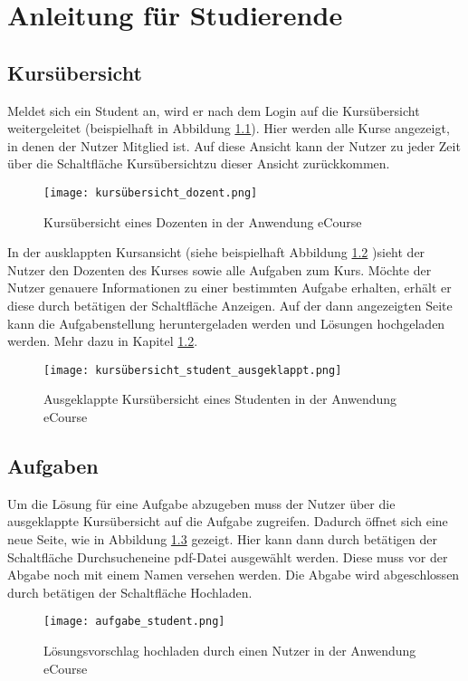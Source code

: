 \chapter{Anleitung für Studierende}
\label{sec:chap3}

\section{Kursübersicht}

Meldet sich ein Student an, wird er nach dem Login auf die Kursübersicht weitergeleitet (beispielhaft in Abbildung \ref{fib:kursübersicht_student}). Hier werden alle Kurse angezeigt, in denen der Nutzer Mitglied ist.
Auf diese Ansicht kann der Nutzer zu jeder Zeit über die Schaltfläche \glqq Kursübersicht\grqq zu dieser Ansicht zurückkommen. 

\begin{figure}[h]
\centering
\texttt{[image: kursübersicht\_dozent.png]}
\caption{Kursübersicht eines Dozenten in der Anwendung eCourse}
\label{fib:kursübersicht_student}
\end{figure}

In der ausklappten Kursansicht (siehe beispielhaft Abbildung \ref{fib:kursübersicht_student_aus} )sieht der Nutzer den Dozenten des Kurses sowie alle Aufgaben zum Kurs. Möchte der Nutzer genauere Informationen zu einer bestimmten Aufgabe erhalten, erhält er diese durch betätigen der Schaltfläche \glqq Anzeigen\grqq. Auf der dann angezeigten Seite kann die Aufgabenstellung heruntergeladen werden und Lösungen hochgeladen werden. Mehr dazu in Kapitel \ref{sec:aufg}.

\begin{figure}[h]
\centering
\texttt{[image: kursübersicht\_student\_ausgeklappt.png]}
\caption{Ausgeklappte Kursübersicht eines Studenten in der Anwendung eCourse}
\label{fib:kursübersicht_student_aus}
\end{figure}

\section{Aufgaben}
\label{sec:aufg}
Um die Lösung für eine Aufgabe abzugeben muss der Nutzer über die ausgeklappte Kursübersicht auf die Aufgabe zugreifen. Dadurch öffnet sich eine neue Seite, wie in Abbildung \ref{fib:hochladen} gezeigt. Hier kann dann durch betätigen der Schaltfläche \glqq Durchsuchen\grqq eine pdf-Datei ausgewählt werden. Diese muss vor der Abgabe noch mit einem Namen versehen werden. Die Abgabe wird abgeschlossen durch betätigen der Schaltfläche \glqq Hochladen\grqq.
\begin{figure}[h]
\centering
\texttt{[image: aufgabe\_student.png]}
\caption{Lösungsvorschlag hochladen durch einen Nutzer in der Anwendung eCourse}
\label{fib:hochladen}
\end{figure}
